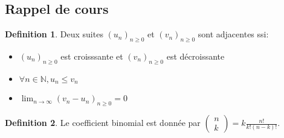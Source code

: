 \documentclass[]{book}
\theoremstyle{definition}
\newtheorem{defn}{Definition}
\newcommand{\bb}[1]{\mathbb{#1}}
\newcommand{\N}{\bb{N}}
\begin{document}
\subsection*{Rappel de cours}
\begin{defn}
Deux suites $(u_n)_{n\geq0}$ et $(v_n)_{n\geq0}$ sont adjacentes ssi:
\begin{itemize}
\item $(u_n)_{n\geq0}$ est croisssante et $(v_n)_{n\geq0}$ est d\'ecroissante
\item $\forall n \in \N, u_n \leq v_n$
\item $\lim_{n \to \infty}(v_n-u_n)_{n\geq0} = 0$
\end{itemize}  
\end{defn}

\begin{defn}
Le coefficient binomial est donn\'ee par
$\begin{pmatrix}n\\k\end{pmatrix} = k\frac{n!}{k!(n-k)!}$.
\end{defn}
\end{document}
